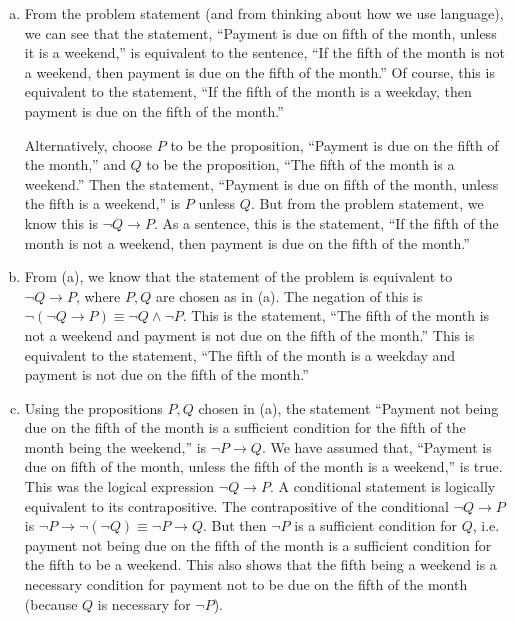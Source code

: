 \documentclass[11pt,letterpaper]{article}
\begin{document}
\sol 
\begin{enumerate}[(a)] 
\item From the problem statement (and from thinking about how we use language), we can see that the statement, ``Payment is due on fifth of the month, unless it is a weekend,'' is equivalent to the sentence, ``If the fifth of the month is not a weekend, then payment is due on the fifth of the month.'' Of course, this is equivalent to the statement, ``If the fifth of the month is a weekday, then payment is due on the fifth of the month.'' \pspace

Alternatively, choose $P$ to be the proposition, ``Payment is due on the fifth of the month,'' and $Q$ to be the proposition, ``The fifth of the month is a weekend.'' Then the statement, ``Payment is due on fifth of the month, unless the fifth is a weekend,'' is $P$ unless $Q$. But from the problem statement, we know this is $\neg Q \to P$. As a sentence, this is the statement, ``If the fifth of the month is not a weekend, then payment is due on the fifth of the month.'' \pspace

\item From (a), we know that the statement of the problem is equivalent to $\neg Q \to P$, where $P, Q$ are chosen as in (a). The negation of this is $\neg (\neg Q \to P) \equiv \neg Q \wedge \neg P$. This is the statement, ``The fifth of the month is not a weekend and payment is not due on the fifth of the month.'' This is equivalent to the statement, ``The fifth of the month is a weekday and payment is not due on the fifth of the month.'' \pspace

\item Using the propositions $P, Q$ chosen in (a), the statement ``Payment not being due on the fifth of the month is a sufficient condition for the fifth of the month being the weekend,'' is $\neg P \to Q$. We have assumed that, ``Payment is due on fifth of the month, unless the fifth of the month is a weekend,'' is true. This was the logical expression $\neg Q \to P$. A conditional statement is logically equivalent to its contrapositive. The contrapositive of the conditional $\neg Q \to P$ is $\neg P \to \neg (\neg Q) \equiv \neg P \to Q$. But then $\neg P$ is a sufficient condition for $Q$, i.e. payment not being due on the fifth of the month is a sufficient condition for the fifth to be a weekend. This also shows that the fifth being a weekend is a necessary condition for payment not to be due on the fifth of the month (because $Q$ is necessary for $\neg P$). \pspace


\end{enumerate}
\end{document}

